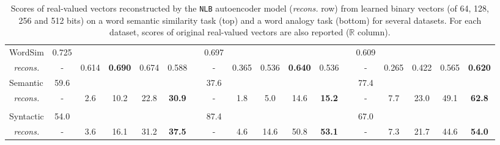 \begin{table}[h]
{\begin{tabular}{@{}lcccccrcccccrccccc@{}}
            WordSim & 0.725 &&&&&& 0.697 &&&&&& 0.609\\
              \multicolumn{1}{c}{\textit{recons.}}
                &-& 0.614 & \textbf{0.690} & 0.674 & 0.588 &
                &-& 0.365 & 0.536 & \textbf{0.640} & 0.536 &
                &-& 0.265 & 0.422 & 0.565 & \textbf{0.620}\\
            \midrule
            Semantic & 59.6 &&&&&& 37.6 &&&&&& 77.4\\
              \multicolumn{1}{c}{\textit{recons.}}
                &-& 2.6 & 10.2 & 22.8 & \textbf{30.9} &
                &-& 1.8 &  5.0 & 14.6 & \textbf{15.2} &
                &-& 7.7 & 23.0 & 49.1 & \textbf{62.8}\\\\

            Syntactic & 54.0 &&&&&& 87.4 &&&&&& 67.0\\
              \multicolumn{1}{c}{\textit{recons.}}
                &-& 3.6 & 16.1 & 31.2 & \textbf{37.5} &
                &-& 4.6 & 14.6 & 50.8 & \textbf{53.1} &
                &-& 7.3 & 21.7 & 44.6 & \textbf{54.0}\\
          \bottomrule[0.15em]
        \end{tabular}}
        \caption[Evaluation of vectors reconstructed from binary codes on
        intrinsic tasks.]{Scores of real-valued vectors reconstructed by the
        \texttt{NLB} autoencoder model (\textit{recons.} row) from learned
        binary vectors (of 64, 128, 256 and 512 bits) on a word semantic
        similarity task (top) and a word analogy task (bottom) for several
        datasets. For each dataset, scores of original real-valued vectors are
        also reported ($\mathbb{R}$ column).}
        \label{ch06:tab:results-reconstructed-semantic-analogies}
      \end{table}

